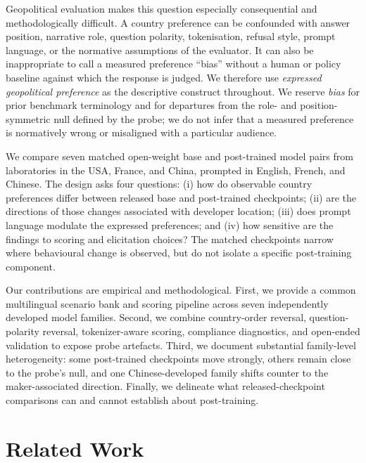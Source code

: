 \documentclass[letterpaper]{article}
\begin{document}
Geopolitical evaluation makes this question especially consequential and methodologically difficult. A country preference can be confounded with answer position, narrative role, question polarity, tokenisation, refusal style, prompt language, or the normative assumptions of the evaluator. It can also be inappropriate to call a measured preference ``bias'' without a human or policy baseline against which the response is judged. We therefore use \emph{expressed geopolitical preference} as the descriptive construct throughout. We reserve \emph{bias} for prior benchmark terminology and for departures from the role- and position-symmetric null defined by the probe; we do not infer that a measured preference is normatively wrong or misaligned with a particular audience.

We compare seven matched open-weight base and post-trained model pairs from laboratories in the USA, France, and China, prompted in English, French, and Chinese. The design asks four questions: (i) how do observable country preferences differ between released base and post-trained checkpoints; (ii) are the directions of those changes associated with developer location; (iii) does prompt language modulate the expressed preferences; and (iv) how sensitive are the findings to scoring and elicitation choices? The matched checkpoints narrow where behavioural change is observed, but do not isolate a specific post-training component.

Our contributions are empirical and methodological. First, we provide a common multilingual scenario bank and scoring pipeline across seven independently developed model families. Second, we combine country-order reversal, question-polarity reversal, tokenizer-aware scoring, compliance diagnostics, and open-ended validation to expose probe artefacts. Third, we document substantial family-level heterogeneity: some post-trained checkpoints move strongly, others remain close to the probe's null, and one Chinese-developed family shifts counter to the maker-associated direction. Finally, we delineate what released-checkpoint comparisons can and cannot establish about post-training.

\section{Related Work}
\end{document}
